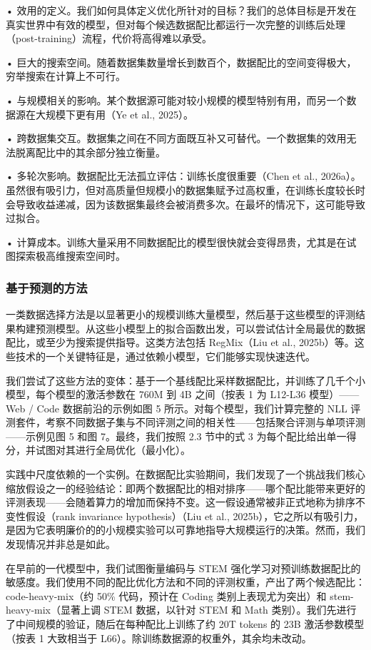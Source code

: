 \documentclass[
  10
]{article}
\begin{document}
• 效用的定义。我们如何具体定义优化所针对的目标？我们的总体目标是开发在真实世界中有效的模型，但对每个候选数据配比都运行一次完整的训练后处理（post-training）流程，代价将高得难以承受。

• 巨大的搜索空间。随着数据集数量增长到数百个，数据配比的空间变得极大，穷举搜索在计算上不可行。

• 与规模相关的影响。某个数据源可能对较小规模的模型特别有用，而另一个数据源在大规模下更有用（Ye et al., 2025）。

• 跨数据集交互。数据集之间在不同方面既互补又可替代。一个数据集的效用无法脱离配比中的其余部分独立衡量。

• 多轮次影响。数据配比无法孤立评估：训练长度很重要（Chen et al., 2026a）。虽然很有吸引力，但对高质量但规模小的数据集赋予过高权重，在训练长度较长时会导致收益递减，因为该数据集最终会被消费多次。在最坏的情况下，这可能导致过拟合。

• 计算成本。训练大量采用不同数据配比的模型很快就会变得昂贵，尤其是在试图探索极高维搜索空间时。

\subsubsection{基于预测的方法}\label{forecastingbased-approaches}

一类数据选择方法是以显著更小的规模训练大量模型，然后基于这些模型的评测结果构建预测模型。从这些小模型上的拟合函数出发，可以尝试估计全局最优的数据配比，或至少为搜索提供指导。这类方法包括 RegMix（Liu et al., 2025b）等。这些技术的一个关键特征是，通过依赖小模型，它们能够实现快速迭代。

我们尝试了这些方法的变体：基于一个基线配比采样数据配比，并训练了几千个小模型，每个模型的激活参数在 760M 到 4B 之间（按表 1 为 L12-L36 模型）——Web / Code 数据前沿的示例如图 5 所示。对每个模型，我们计算完整的 NLL 评测套件，考察不同数据子集与不同评测之间的相关性——包括聚合评测与单项评测——示例见图 5 和图 7。最终，我们按照 2.3 节中的式 3 为每个配比给出单一得分，并试图对其进行全局优化（最小化）。

实践中尺度依赖的一个实例。在数据配比实验期间，我们发现了一个挑战我们核心缩放假设之一的经验结论：即两个数据配比的相对排序——哪个配比能带来更好的评测表现——会随着算力的增加而保持不变。这一假设通常被非正式地称为排序不变性假设（rank invariance hypothesis）（Liu et al., 2025b），它之所以有吸引力，是因为它表明廉价的的小规模实验可以可靠地指导大规模运行的决策。然而，我们发现情况并非总是如此。

在早前的一代模型中，我们试图衡量编码与 STEM 强化学习对预训练数据配比的敏感度。我们使用不同的配比优化方法和不同的评测权重，产出了两个候选配比：code-heavy-mix（约 50\% 代码，预计在 Coding 类别上表现尤为突出）和 stem-heavy-mix（显著上调 STEM 数据，以针对 STEM 和 Math 类别）。我们先进行了中间规模的验证，随后在每种配比上训练了约 20T tokens 的 23B 激活参数模型（按表 1 大致相当于 L66）。除训练数据源的权重外，其余均未改动。
\end{document}
